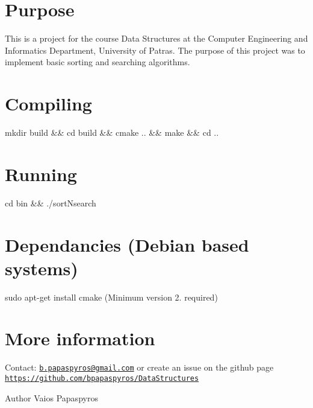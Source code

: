 \hypertarget{index_intro_sec}{}\section{Purpose}\label{index_intro_sec}
This is a project for the course Data Structures at the Computer Engineering and Informatics Department, University of Patras. The purpose of this project was to implement basic sorting and searching algorithms.\hypertarget{index_compile_sec}{}\section{Compiling}\label{index_compile_sec}
\begin{center} mkdir build \&\& cd build \&\& cmake .. \&\& make \&\& cd .. \end{center} \hypertarget{index_run_sec}{}\section{Running}\label{index_run_sec}
\begin{center} cd bin \&\& ./sort\-Nsearch \end{center} \hypertarget{index_dep_sec}{}\section{Dependancies (\-Debian based systems)}\label{index_dep_sec}
\begin{center} sudo apt-\/get install cmake (Minimum version 2. required) \end{center} \hypertarget{index_info_sec}{}\section{More information}\label{index_info_sec}
Contact\-: \href{mailto:b.papaspyros@gmail.com}{\tt b.\-papaspyros@gmail.\-com} or create an issue on the github page \href{https://github.com/bpapaspyros/DataStructures}{\tt https\-://github.\-com/bpapaspyros/\-Data\-Structures}

\begin{DoxyAuthor}{Author}
Vaios Papaspyros 
\end{DoxyAuthor}
